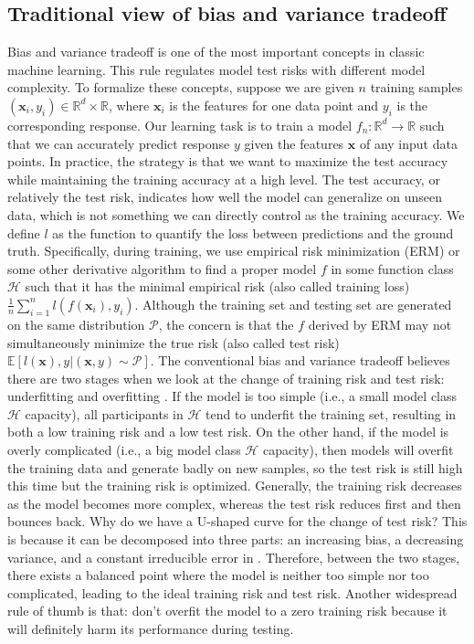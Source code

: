 \documentclass{article}
\begin{document}
\subsection{Traditional view of bias and variance tradeoff} \label{traditional}
\vspace{-1mm}
Bias and variance tradeoff is one of the most important concepts in classic machine learning. This rule regulates model test risks with different model complexity. To formalize these concepts, suppose we are given $n$ training samples $(\mathbf{x}_i, y_i) \in \mathbb{R}^d \times \mathbb{R}$, where $\mathbf{x}_i$ is the features for one data point and $y_i$ is the corresponding response. Our learning task is to train a model $f_n: \mathbb{R}^d \to \mathbb{R}$ such that we can accurately predict response $y$ given the features $\mathbf{x}$ of any input data points. In practice, the strategy is that we want to maximize the test accuracy while maintaining the training accuracy at a high level. The test accuracy, or relatively the test risk, indicates how well the model can generalize on unseen data, which is not something we can directly control as the training accuracy. We define $l$ as the function to quantify the loss between predictions and the ground truth. Specifically, during training, we use empirical risk minimization (ERM) or some other derivative algorithm to find a proper model $f$ in some function class $\mathcal{H}$ such that it has the minimal empirical risk (also called training loss) $\frac{1}{n}\sum_{i=1}^nl(f(\mathbf{x}_i), y_i)$. Although the training set and testing set are generated on the same distribution $\mathcal{P}$, the concern is that the $f$ derived by ERM may not simultaneously minimize the true risk (also called test risk) $\mathbb{E}[l(\mathbf{x}), y|(\mathbf{x}, y) \sim \mathcal{P}]$. The conventional bias and variance tradeoff believes there are two stages when we look at the change of training risk and test risk: underfitting and overfitting \cite{hastie2009elements}. If the model is too simple (i.e., a small model class $\mathcal{H}$ capacity), all participants in $\mathcal{H}$ tend to underfit the training set, resulting in both a low training risk and a low test risk. On the other hand, if the model is overly complicated (i.e., a big model class $\mathcal{H}$ capacity), then models will overfit the training data and generate badly on new samples, so the test risk is still high this time but the training risk is optimized. Generally, the training risk decreases as the model becomes more complex, whereas the test risk reduces first and then bounces back. Why do we have a U-shaped curve for the change of test risk? This is because it can be decomposed into three parts: an increasing bias, a decreasing variance, and a constant irreducible error in \cite{neville2008bias}. Therefore, between the two stages, there exists a balanced point where the model is neither too simple nor too complicated, leading to the ideal training risk and test risk. Another widespread rule of thumb is that: don't overfit the model to a zero training risk because it will definitely harm its performance during testing.
\end{document}
